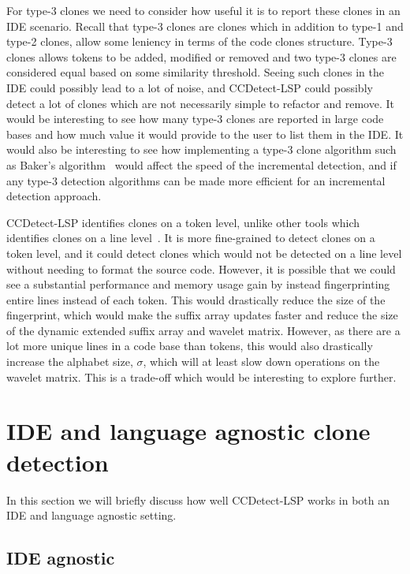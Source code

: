For type-3 clones we need to consider how useful it is to report these clones in an IDE
scenario. Recall that type-3 clones are clones which in addition to type-1 and type-2
clones, allow some leniency in terms of the code clones structure. Type-3 clones allows
tokens to be added, modified or removed and two type-3 clones are considered equal based
on some similarity threshold. Seeing such clones in the IDE could possibly lead to a lot
of noise, and CCDetect-LSP could possibly detect a lot of clones which are not necessarily
simple to refactor and remove. It would be interesting to see how many type-3 clones are
reported in large code bases and how much value it would provide to the user to list them
in the IDE. It would also be interesting to see how implementing a type-3 clone algorithm
such as Baker's algorithm~\cite{BakerSparseDynamicProgramming} would affect the speed of
the incremental detection, and if any type-3 detection algorithms can be made more
efficient for an incremental detection approach.

CCDetect-LSP identifies clones on a token level, unlike other tools which identifies
clones on a line level~\cite{Zibran_real_time_search}. It is more fine-grained to detect
clones on a token level, and it could detect clones which would not be detected on a line
level without needing to format the source code. However, it is possible that we could see
a substantial performance and memory usage gain by instead fingerprinting entire lines
instead of each token. This would drastically reduce the size of the fingerprint, which
would make the suffix array updates faster and reduce the size of the dynamic extended
suffix array and wavelet matrix. However, as there are a lot more unique lines in a code
base than tokens, this would also drastically increase the alphabet size, $\sigma$, which
will at least slow down operations on the wavelet matrix. This is a trade-off which would
be interesting to explore further.

\section{IDE and language agnostic clone detection}

In this section we will briefly discuss how well CCDetect-LSP works in both an IDE and
language agnostic setting.

\subsection*{IDE agnostic}

